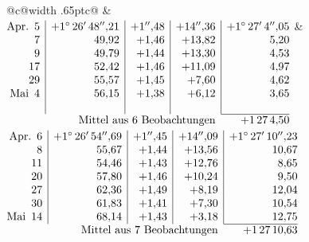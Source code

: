 \noindent\begin{tabular}{@{}c@{\hspace{.4em}\vrule width .65pt\hspace{.4em}}c@{}}
 &
 \\[.18ex]
\(\begin{array}[t]{@{}r|r|r|r|r@{}}
\text{Apr.}\enspace 5 & +1^\circ\,26'\,48''{,}21 & +1''{,}48 & +14''{,}36 & +1^\circ\,27'\,4''{,}05\\
7 & 49{,}92 & +1{,}46 & +13{,}82 & 5{,}20\\
9 & 49{,}79 & +1{,}44 & +13{,}30 & 4{,}53\\
17 & 52{,}42 & +1{,}46 & +11{,}09 & 4{,}97\\
29 & 55{,}57 & +1{,}45 & +7{,}60 & 4{,}62\\
\text{Mai}\enspace 4 & 56{,}15 & +1{,}38 & +6{,}12 & 3{,}65\\
 & & & & \\
\cline{5-5}
\multicolumn{4}{r}{\text{Mittel aus 6 Beobachtungen}} & +1\,27\,4{,}50
\end{array}\)
&
\(\begin{array}[t]{@{}r|r|r|r|r@{}}
\text{Apr.}\enspace 6 & +1^\circ\,26'\,54''{,}69 & +1''{,}45 & +14''{,}09 & +1^\circ\,27'\,10''{,}23\\
8 & 55{,}67 & +1{,}44 & +13{,}56 & 10{,}67\\
11 & 54{,}46 & +1{,}43 & +12{,}76 & 8{,}65\\
20 & 57{,}80 & +1{,}46 & +10{,}24 & 9{,}50\\
27 & 62{,}36 & +1{,}49 & +8{,}19 & 12{,}04\\
30 & 61{,}83 & +1{,}41 & +7{,}30 & 10{,}54\\
\text{Mai}\enspace 14 & 68{,}14 & +1{,}43 & +3{,}18 & 12{,}75\\
\cline{5-5}
\multicolumn{4}{r}{\text{Mittel aus 7 Beobachtungen}} & +1\,27\,10{,}63
\end{array}\)
\end{tabular}\par\medskip
